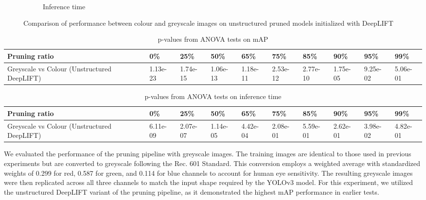 \documentclass[journal,onecolumn,12pt]{IEEEtran}
\begin{document}
\begin{figure}
\begin{subfigure}[b]{.5\textwidth}
      \caption{Inference time}
      \label{fig:time2}
    \end{subfigure}
    \caption{Comparison of performance between colour and greyscale images on unstructured pruned models initialized with DeepLIFT}
    \label{fig:result2}
\end{figure}

\begin{table}[htbp]
    \caption{p-values from ANOVA tests on mAP}
    \begin{center}
    \begin{tabular}{ |p{3.3cm}|p{1.2cm}|p{1.2cm}|p{1.2cm}|p{1.2cm}|p{1.2cm}|p{1.2cm}|p{1.2cm}|p{1.2cm}|p{1.2cm}|  }
    \hline
    Pruning ratio  & 0\% & 25\%& 50\%& 65\%& 75\%& 85\%& 90\%& 95\%& 99\%\\
     \hline
     Greyscale vs Colour (Unstructured DeepLIFT)      & 1.13e-23& 1.74e-15& 1.06e-13& 1.18e-11& 2.53e-12& 2.77e-10& 1.75e-05& 9.25e-02& 5.06e-01 \\
     \hline
    \end{tabular}
    \end{center}
    \label{tab:p2-mAP}
\end{table}

\begin{table}[htbp]
    \caption{p-values from ANOVA tests on inference time}
    \begin{center}
    \begin{tabular}{ |p{3.3cm}|p{1.2cm}|p{1.2cm}|p{1.2cm}|p{1.2cm}|p{1.2cm}|p{1.2cm}|p{1.2cm}|p{1.2cm}|p{1.2cm}|  }
     \hline
     Pruning ratio  & 0\% & 25\%& 50\%& 65\%& 75\%& 85\%& 90\%& 95\%& 99\%\\
     \hline
     Greyscale vs Colour (Unstructured DeepLIFT)       & 6.11e-09& 2.07e-07& 1.14e-05& 4.42e-04& 2.08e-01& 5.59e-01& 2.62e-01& 3.98e-02& 4.82e-01 \\
     \hline
    \end{tabular}
    \end{center}
    \label{tab:p2-time}
\end{table}


We evaluated the performance of the pruning pipeline with greyscale images. The training images are identical to those used in previous experiments but are converted to greyscale following the Rec. 601 Standard. This conversion employs a weighted average with standardized weights of 0.299 for red, 0.587 for green, and 0.114 for blue channels to account for human eye sensitivity. The resulting greyscale images were then replicated across all three channels to match the input shape required by the YOLOv3 model. For this experiment, we utilized the unstructured DeepLIFT variant of the pruning pipeline, as it demonstrated the highest mAP performance in earlier tests.
\end{document}
